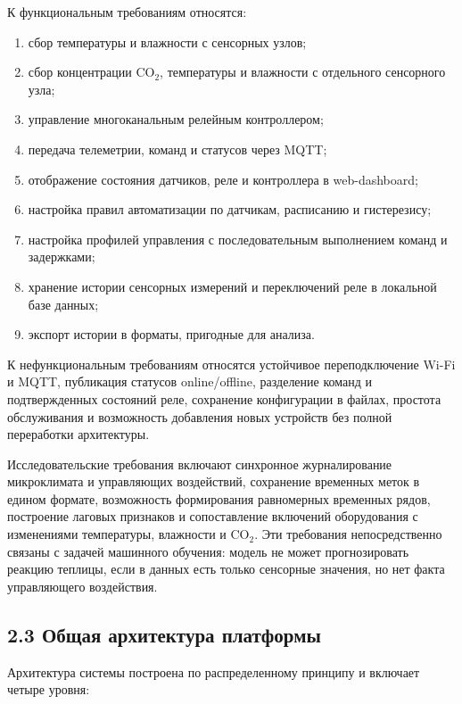 \documentclass[a4paper,14pt]{extarticle}
\providecommand{\tightlist}{%
  \setlength{\itemsep}{0pt}\setlength{\parskip}{0pt}}
\begin{document}
К функциональным требованиям относятся:

\begin{enumerate}
\def\labelenumi{\arabic{enumi})}
\tightlist
\item
  сбор температуры и влажности с сенсорных узлов;
\item
  сбор концентрации CO\(_2\), температуры и влажности с отдельного
  сенсорного узла;
\item
  управление многоканальным релейным контроллером;
\item
  передача телеметрии, команд и статусов через MQTT;
\item
  отображение состояния датчиков, реле и контроллера в web-dashboard;
\item
  настройка правил автоматизации по датчикам, расписанию и гистерезису;
\item
  настройка профилей управления с последовательным выполнением команд и
  задержками;
\item
  хранение истории сенсорных измерений и переключений реле в локальной
  базе данных;
\item
  экспорт истории в форматы, пригодные для анализа.
\end{enumerate}

К нефункциональным требованиям относятся устойчивое переподключение
Wi-Fi и MQTT, публикация статусов online/offline, разделение команд и
подтвержденных состояний реле, сохранение конфигурации в файлах,
простота обслуживания и возможность добавления новых устройств без
полной переработки архитектуры.

Исследовательские требования включают синхронное журналирование
микроклимата и управляющих воздействий, сохранение временных меток в
едином формате, возможность формирования равномерных временных рядов,
построение лаговых признаков и сопоставление включений оборудования с
изменениями температуры, влажности и CO\(_2\). Эти требования
непосредственно связаны с задачей машинного обучения: модель не может
прогнозировать реакцию теплицы, если в данных есть только сенсорные
значения, но нет факта управляющего воздействия.

\subsection{2.3 Общая архитектура
платформы}\label{ux43eux431ux449ux430ux44f-ux430ux440ux445ux438ux442ux435ux43aux442ux443ux440ux430-ux43fux43bux430ux442ux444ux43eux440ux43cux44b}

Архитектура системы построена по распределенному принципу и включает
четыре уровня:
\end{document}
